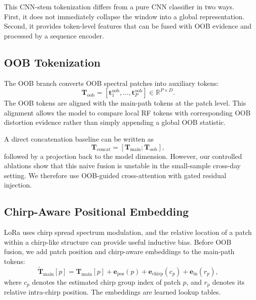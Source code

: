 This CNN-stem tokenization differs from a pure CNN classifier in two ways. First, it does not immediately collapse the window into a global representation. Second, it provides token-level features that can be fused with OOB evidence and processed by a sequence encoder.

\subsection{OOB Tokenization}

The OOB branch converts OOB spectral patches into auxiliary tokens:
\begin{equation}
    \mathbf{T}_{\mathrm{oob}}
    =
    [\mathbf{t}^{\mathrm{oob}}_1,\ldots,\mathbf{t}^{\mathrm{oob}}_P]
    \in \mathbb{R}^{P \times D}.
\end{equation}
The OOB tokens are aligned with the main-path tokens at the patch level. This alignment allows the model to compare local RF tokens with corresponding OOB distortion evidence rather than simply appending a global OOB statistic.

A direct concatenation baseline can be written as
\begin{equation}
    \mathbf{T}_{\mathrm{concat}}
    =
    [\mathbf{T}_{\mathrm{main}};\mathbf{T}_{\mathrm{oob}}],
\end{equation}
followed by a projection back to the model dimension. However, our controlled ablations show that this naive fusion is unstable in the small-sample cross-day setting. We therefore use OOB-guided cross-attention with gated residual injection.

\subsection{Chirp-Aware Positional Embedding}

LoRa uses chirp spread spectrum modulation, and the relative location of a patch within a chirp-like structure can provide useful inductive bias. Before OOB fusion, we add patch position and chirp-aware embeddings to the main-path tokens:
\begin{equation}
    \widetilde{\mathbf{T}}_{\mathrm{main}}[p]
    =
    \mathbf{T}_{\mathrm{main}}[p]
    +
    \mathbf{e}_{\mathrm{pos}}(p)
    +
    \mathbf{e}_{\mathrm{chirp}}(c_p)
    +
    \mathbf{e}_{\mathrm{in}}(r_p),
\end{equation}
where $c_p$ denotes the estimated chirp group index of patch $p$, and $r_p$ denotes its relative intra-chirp position. The embeddings are learned lookup tables.


